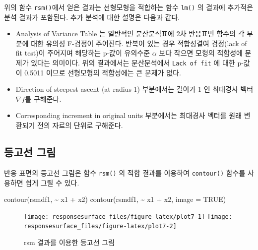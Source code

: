 \documentclass[
]{book}
\newenvironment{Shaded}{\begin{snugshade}}{\end{snugshade}}
\newcommand{\AttributeTok}[1]{\textcolor[rgb]{0.77,0.63,0.00}{#1}}
\newcommand{\ConstantTok}[1]{\textcolor[rgb]{0.00,0.00,0.00}{#1}}
\newcommand{\FunctionTok}[1]{\textcolor[rgb]{0.00,0.00,0.00}{#1}}
\newcommand{\NormalTok}[1]{#1}
\newcommand{\SpecialCharTok}[1]{\textcolor[rgb]{0.00,0.00,0.00}{#1}}
\theoremstyle{definition}
\theoremstyle{definition}
\theoremstyle{definition}
\theoremstyle{definition}
\theoremstyle{remark}
\begin{document}
위의 함수 \texttt{rsm()}에서 얻은 결과는 선형모형을 적합하는 함수 \texttt{lm()} 의 결과에 추가적은 분석 결과가 포함된다. 추가 분석에 대한 설명은 다음과 같다.

\begin{itemize}
\item
  Analysis of Variance Table 는 일반적인 분산분석표에 2차 반응표면 함수의 각 부분에 대한 유의성 F-검정이 주어진다. 반복이 있는 경우 적합성결여 검정(lack of fit test)이 주어지며 해당하는 p-값이 유의수준 \(\alpha\) 보다 작으면 모형의 적합성에 문제가 있다는 의미이다. 위의 결과에서는 분산분석에서 \texttt{Lack\ of\ fit} 에 대한 p-값이 0.5011 이므로 선형모형의 적합성에는 큰 문제가 없다.
\item
  Direction of steepest ascent (at radius 1) 부분에서는 길이가 1 인 최대경사 벡터 \(\nabla f\)를 구해준다.
\item
  Corresponding increment in original units 부분에서는 최대경사 벡터를 원래 변환되기 전의 자료의 단위로 구해준다.
\end{itemize}

\hypertarget{uxb4f1uxace0uxc120-uxadf8uxb9bc}{%
\subsection{등고선 그림}\label{uxb4f1uxace0uxc120-uxadf8uxb9bc}}

반응 표면의 등고선 그림은 함수 \texttt{rsm()} 의 적합 결과를 이용하여 \texttt{contour()} 함수를 사용하면 쉽게 그릴 수 있다.

\begin{Shaded}
\begin{Highlighting}[]
\FunctionTok{contour}\NormalTok{(rsmdf1, }\SpecialCharTok{\textasciitilde{}}\NormalTok{ x1 }\SpecialCharTok{+}\NormalTok{ x2)}
\FunctionTok{contour}\NormalTok{(rsmdf1, }\SpecialCharTok{\textasciitilde{}}\NormalTok{ x1 }\SpecialCharTok{+}\NormalTok{ x2, }\AttributeTok{image =} \ConstantTok{TRUE}\NormalTok{)}
\end{Highlighting}
\end{Shaded}

\begin{figure}

{\centering \texttt{[image: responsesurface\_files/figure-latex/plot7-1]} \texttt{[image: responsesurface\_files/figure-latex/plot7-2]} 

}

\caption{rsm 결과를 이용한 등고선 그림 }\label{fig:plot7}
\end{figure}
\end{document}
